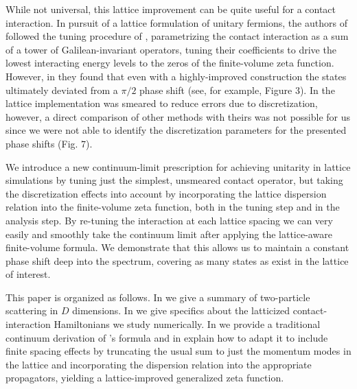 While not universal, this lattice improvement can be quite useful for a contact interaction.
In pursuit of a lattice formulation of unitary fermions, the authors of  followed the tuning procedure of , parametrizing the contact interaction as a sum of a tower of Galilean-invariant operators, tuning their coefficients to drive the lowest interacting energy levels to the zeros of the \Luscher finite-volume zeta function.
However, in  they found that even with a highly-improved construction the states ultimately deviated from a $\pi/2$ phase shift (see, for example, Figure 3).
In  the lattice implementation was smeared to reduce errors due to discretization, however, a direct comparison of other methods with theirs was not possible for us since we were not able to identify the discretization parameters for the presented phase shifts (Fig. 7).

We introduce a new continuum-limit prescription for achieving unitarity in lattice simulations by tuning just the simplest, unsmeared contact operator, but taking the discretization effects into account by incorporating the lattice dispersion relation into the finite-volume zeta function, both in the tuning step and in the analysis step.
By re-tuning the interaction at each lattice spacing we can very easily and smoothly take the continuum limit after applying the lattice-aware finite-volume formula.
We demonstrate that this allows us to maintain a constant phase shift deep into the spectrum, covering as many \Aoneg states as exist in the lattice of interest.

This paper is organized as follows.  In  we give a summary of two-particle scattering in $D$ dimensions.
In  we give specifics about the latticized contact-interaction Hamiltonians we study numerically.
In  we provide a traditional continuum derivation of \Luscher's formula and in  explain how to adapt it to include finite spacing effects by truncating the usual sum to just the momentum modes in the lattice and incorporating the dispersion relation into the appropriate propagators, yielding a lattice-improved generalized \Luscher zeta function.

